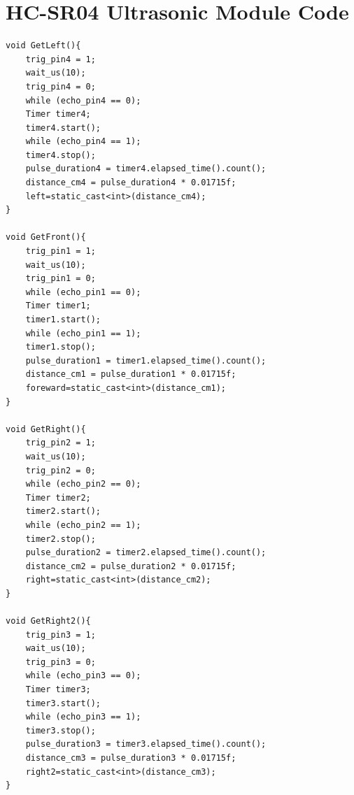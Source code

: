 \documentclass[12pt, a4paper, oneside]{report}
\begin{document}
\newpage
\section*{HC-SR04 Ultrasonic Module Code}
\begin{lstlisting}
void GetLeft(){
    trig_pin4 = 1;
    wait_us(10);
    trig_pin4 = 0;
    while (echo_pin4 == 0);
    Timer timer4;
    timer4.start();
    while (echo_pin4 == 1);
    timer4.stop();
    pulse_duration4 = timer4.elapsed_time().count();
    distance_cm4 = pulse_duration4 * 0.01715f;
    left=static_cast<int>(distance_cm4);
}

void GetFront(){
    trig_pin1 = 1;
    wait_us(10);
    trig_pin1 = 0;
    while (echo_pin1 == 0);
    Timer timer1;
    timer1.start();
    while (echo_pin1 == 1);
    timer1.stop();
    pulse_duration1 = timer1.elapsed_time().count();
    distance_cm1 = pulse_duration1 * 0.01715f;
    foreward=static_cast<int>(distance_cm1);
}

void GetRight(){
    trig_pin2 = 1;
    wait_us(10);
    trig_pin2 = 0;
    while (echo_pin2 == 0);
    Timer timer2;
    timer2.start();
    while (echo_pin2 == 1);
    timer2.stop();
    pulse_duration2 = timer2.elapsed_time().count();
    distance_cm2 = pulse_duration2 * 0.01715f;
    right=static_cast<int>(distance_cm2);
}

void GetRight2(){
    trig_pin3 = 1;
    wait_us(10);
    trig_pin3 = 0;
    while (echo_pin3 == 0);
    Timer timer3;
    timer3.start();
    while (echo_pin3 == 1);
    timer3.stop();
    pulse_duration3 = timer3.elapsed_time().count();
    distance_cm3 = pulse_duration3 * 0.01715f;
    right2=static_cast<int>(distance_cm3);
}

\end{lstlisting}
\newpage
\end{document}
